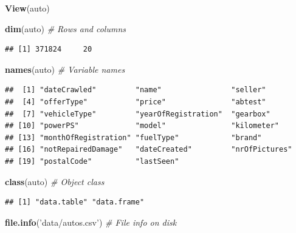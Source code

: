 \documentclass[]{book}
\newenvironment{Shaded}{\begin{snugshade}}{\end{snugshade}}
\newcommand{\KeywordTok}[1]{\textcolor[rgb]{0.13,0.29,0.53}{\textbf{#1}}}
\newcommand{\StringTok}[1]{\textcolor[rgb]{0.31,0.60,0.02}{#1}}
\newcommand{\CommentTok}[1]{\textcolor[rgb]{0.56,0.35,0.01}{\textit{#1}}}
\newcommand{\NormalTok}[1]{#1}
\theoremstyle{definition}
\theoremstyle{definition}
\theoremstyle{definition}
\theoremstyle{remark}
\begin{document}
\begin{Shaded}
\begin{Highlighting}[]
\KeywordTok{View}\NormalTok{(auto)}
\end{Highlighting}
\end{Shaded}

\begin{Shaded}
\begin{Highlighting}[]
\KeywordTok{dim}\NormalTok{(auto) }\CommentTok{#  Rows and columns}
\end{Highlighting}
\end{Shaded}

\begin{verbatim}
## [1] 371824     20
\end{verbatim}

\begin{Shaded}
\begin{Highlighting}[]
\KeywordTok{names}\NormalTok{(auto) }\CommentTok{# Variable names}
\end{Highlighting}
\end{Shaded}

\begin{verbatim}
##  [1] "dateCrawled"         "name"                "seller"             
##  [4] "offerType"           "price"               "abtest"             
##  [7] "vehicleType"         "yearOfRegistration"  "gearbox"            
## [10] "powerPS"             "model"               "kilometer"          
## [13] "monthOfRegistration" "fuelType"            "brand"              
## [16] "notRepairedDamage"   "dateCreated"         "nrOfPictures"       
## [19] "postalCode"          "lastSeen"
\end{verbatim}

\begin{Shaded}
\begin{Highlighting}[]
\KeywordTok{class}\NormalTok{(auto) }\CommentTok{# Object class}
\end{Highlighting}
\end{Shaded}

\begin{verbatim}
## [1] "data.table" "data.frame"
\end{verbatim}

\begin{Shaded}
\begin{Highlighting}[]
\KeywordTok{file.info}\NormalTok{(}\StringTok{'data/autos.csv'}\NormalTok{) }\CommentTok{# File info on disk}
\end{Highlighting}
\end{Shaded}
\end{document}
